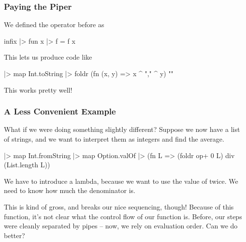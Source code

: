 \documentclass[aspectratio=169, handout]{beamer}
\begin{document}
\begin{frame}[fragile]
  \frametitle{Paying the Piper}

  We defined the \code{|>} operator before as
  \begin{codeblock}
    infix |>
    fun x |> f = f x
  \end{codeblock}

  \pause
  \vspace{\fill}

  This lets us produce code like
  \begin{codeblock}
    [1, 2, 3] 
    |> map Int.toString
    |> foldr (fn (x, y) => x ^ "," ^ y) ""
  \end{codeblock}

  \pause
  \vspace{\fill}

  This works pretty well!
\end{frame}

\begin{frame}[fragile]
  \frametitle{A Less Convenient Example}

  What if we were doing something slightly different? Suppose we now have
  a list of strings, and we want to interpret them as integers and find the
  average.

  \pause
  \vspace{\fill}

  \begin{codeblock}
    ["1", "2", "3"] 
    |> map Int.fromString 
    |> map Option.valOf
    |> (fn L => (foldr op+ 0 L) div (List.length L)) 
  \end{codeblock}

  \pause
  \vspace{\fill}

  We have to introduce a lambda, because we want to use the value of
   twice. We need to know how much the denominator is.
  
  \pause
  \vspace{\fill}

  This is kind of gross, and breaks our nice sequencing, though! Because of 
  this  function, it's not clear what the control flow of our
  function is. Before, our steps were cleanly separated by pipes -- now, 
  we rely on evaluation order. Can we do better?
\end{frame}
\end{document}

